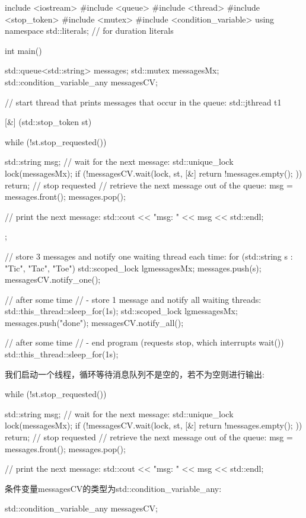 \begin{cpp}
include <iostream>
#include <queue>
#include <thread>
#include <stop_token>
#include <mutex>
#include <condition_variable>
using namespace std::literals; // for duration literals

int main()
{
	std::queue<std::string> messages;
	std::mutex messagesMx;
	std::condition_variable_any messagesCV;
	
	// start thread that prints messages that occur in the queue:
	std::jthread t1{[&] (std::stop_token st) {
			while (!st.stop_requested()) {
				std::string msg;
				{
					// wait for the next message:
					std::unique_lock lock(messagesMx);
					if (!messagesCV.wait(lock, st,
										[&] {
											return !messages.empty();
										})) {
						return; // stop requested
					}
					// retrieve the next message out of the queue:
					msg = messages.front();
					messages.pop();
				}
				
				// print the next message:
				std::cout << "msg: " << msg << std::endl;
			}
	}};

	// store 3 messages and notify one waiting thread each time:
	for (std::string s : {"Tic", "Tac", "Toe"}) {
		std::scoped_lock lg{messagesMx};
		messages.push(s);
		messagesCV.notify_one();
	}
	
	// after some time
	// - store 1 message and notify all waiting threads:
	std::this_thread::sleep_for(1s);
	{
		std::scoped_lock lg{messagesMx};
		messages.push("done");
		messagesCV.notify_all();
	}
	
	// after some time
	// - end program (requests stop, which interrupts wait())
	std::this_thread::sleep_for(1s);
}
\end{cpp}

我们启动一个线程，循环等待消息队列不是空的，若不为空则进行输出:

\begin{cpp}
while (!st.stop_requested()) {
	std::string msg;
	{
		// wait for the next message:
		std::unique_lock lock(messagesMx);
		if (!messagesCV.wait(lock, st,
							[&] {
								return !messages.empty();
							})) {
			return; // stop requested
		}
		// retrieve the next message out of the queue:
		msg = messages.front();
		messages.pop();
	}
	
	// print the next message:
	std::cout << "msg: " << msg << std::endl;
}
\end{cpp}

条件变量messagesCV的类型为std::condition\_variable\_any:

\begin{cpp}
std::condition_variable_any messagesCV;
\end{cpp}

